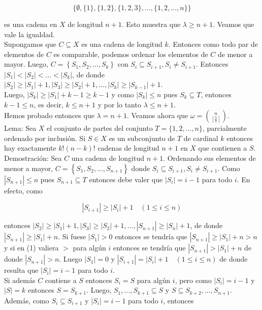 \documentclass[10pt]{article}
\begin{document}
$$
\{\emptyset,\{1\},\{1,2\},\{1,2,3\}, \ldots,\{1,2, \ldots, n\}\}
$$

es una cadena en $X$ de longitud $n+1$. Esto muestra que $\lambda \geq n+1$. Veamos que vale la igualdad.\\
Supongamos que $C \subseteq X$ es una cadena de longitud $k$. Entonces como todo par de elementos de $C$ es comparable, podemos ordenar los elementos de $C$ de menor a mayor. Luego, $C=\left\{S_{1}, S_{2}, \ldots, S_{k}\right\}$ con $S_{i} \subseteq S_{i+1}, S_{i} \neq S_{i+1}$. Entonces $\left|S_{1}\right|<\left|S_{2}\right|<\ldots<\left|S_{k}\right|$, de donde $\left|S_{2}\right| \geq\left|S_{1}\right|+1,\left|S_{3}\right| \geq\left|S_{2}\right|+1, \ldots,\left|S_{k}\right| \geq\left|S_{k-1}\right|+1$.\\
Luego, $\left|S_{k}\right| \geq\left|S_{1}\right|+k-1 \geq k-1$ y como $\left|S_{k}\right| \leq n$ pues $S_{k} \subseteq T$, entonces $k-1 \leq n$, es decir, $k \leq n+1$ y por lo tanto $\lambda \leq n+1$.\\
Hemos probado entonces que $\lambda=n+1$. Veamos ahora que $\omega=\binom{n}{\left[\frac{n}{2}\right]}$.\\
Lema: Sea $X$ el conjunto de partes del conjunto $T=\{1,2, \ldots, n\}$, parcialmente ordenado por inclusión. Si $S \in X$ es un subconjunto de $T$ de cardinal $k$ entonces hay exactamente $k!(n-k)!$ cadenas de longitud $n+1$ en $X$ que contienen a $S$.\\
Demostración: Sea $C$ una cadena de longitud $n+1$. Ordenando sus elementos de menor a mayor, $C=\left\{S_{1}, S_{2}, \ldots, S_{n+1}\right\}$ donde $S_{i} \subseteq S_{i+1}, S_{i} \neq S_{i+1}$. Como $\left|S_{n+1}\right| \leq n$ pues $S_{n+1} \subseteq T$ entonces debe valer que $\left|S_{i}\right|=i-1$ para todo $i$. En efecto, como


\begin{equation*}
\left|S_{i+1}\right| \geq\left|S_{i}\right|+1 \quad(1 \leq i \leq n) \tag{1}
\end{equation*}


entonces $\left|S_{2}\right| \geq\left|S_{1}\right|+1,\left|S_{3}\right| \geq\left|S_{2}\right|+1, \ldots,\left|S_{n+1}\right| \geq\left|S_{n}\right|+1$, de donde $\left|S_{n+1}\right| \geq\left|S_{1}\right|+n$. Si fuese $\left|S_{1}\right|>0$ entonces se tendría que $\left|S_{n+1}\right| \geq\left|S_{1}\right|+n>n$ y si en (1) valiera $>$ para algún $i$ entonces se tendría que $\left|S_{n+1}\right|>\left|S_{1}\right|+n$ de donde $\left|S_{n+1}\right|>n$. Luego $\left|S_{1}\right|=0$ y $\left|S_{i+1}\right|=\left|S_{i}\right|+1 \quad(1 \leq i \leq n)$ de donde resulta que $\left|S_{i}\right|=i-1$ para todo $i$.\\
Si además $C$ contiene a $S$ entonces $S_{i}=S$ para algún $i$, pero como $\left|S_{i}\right|=i-1$ y $|S|=k$ entonces $S=S_{k+1}$. Luego, $S_{1}, \ldots, S_{k+1} \subseteq S$ y $S \subseteq S_{k+2}, \ldots, S_{n+1}$. Además, como $S_{i} \subseteq S_{i+1}$ y $\left|S_{i}\right|=i-1$ para todo $i$, entonces
\end{document}
